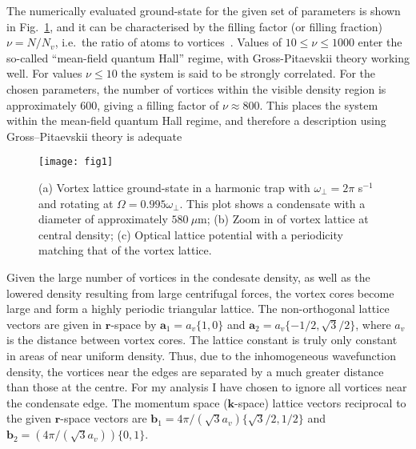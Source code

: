 The numerically evaluated ground-state for the given set of parameters is shown in Fig.~\ref{fig:vlatt_gnd}, and it can be characterised by the filling factor (or filling fraction) $\nu=N/N_v$, i.e.~the ratio of atoms to vortices~\cite{BEC:Fetter_revmodphys_2009}. Values of $10 \leq \nu \leq 1000$ enter the so-called ``mean-field quantum Hall'' regime, with Gross-Pitaevskii theory working well. For values $\nu \leq 10$ the system is said to be strongly correlated. For the chosen parameters, the number of vortices within the visible density region is approximately 600, giving a filling factor of $\nu \approx 800 $. This places the system within the mean-field quantum Hall regime, and therefore a description using Gross--Pitaevskii theory is adequate~\cite{Vtx:Schweikhard_prl_2004}

\begin{figure}[tb]
    \texttt{[image: fig1]}
    \caption{(a) Vortex lattice ground-state in a harmonic trap with $\omega_\perp=2\pi$ s$^{-1}$ and rotating at $\Omega=0.995\omega_\perp$. This plot shows a condensate with a diameter of approximately $580~\mu\textrm{m}$; (b) Zoom in of vortex lattice at central density; (c) Optical lattice potential with a periodicity matching that of the vortex lattice.}
    \label{fig:vlatt_gnd}
\end{figure}

Given the large number of vortices in the condesate density, as well as the lowered density resulting from large centrifugal forces, the vortex cores become large and form a highly periodic triangular lattice. The non-orthogonal lattice vectors are given in $\mathbf{r}$-space by $\mathbf{a}_1 = a_v\{1,0\}$ and $\mathbf{a}_2 = a_v\{-1/2, \sqrt{3}/2\}$, where $a_v$ is the distance between vortex cores. The lattice constant is truly only constant in areas of near uniform density. Thus, due to the inhomogeneous wavefunction density, the vortices near the edges are separated by a much greater distance than those at the centre. For my analysis I have chosen to ignore all vortices near the condensate edge. The momentum space ($\mathbf{k}$-space) lattice vectors reciprocal to the given $\mathbf{r}$-space vectors are $\mathbf{b}_1 = 4\pi/(\sqrt{3}a_v)\{\sqrt{3}/2,1/2\}$ and $\mathbf{b}_2 = (4\pi/(\sqrt{3}a_v))\{0,1\}$.

